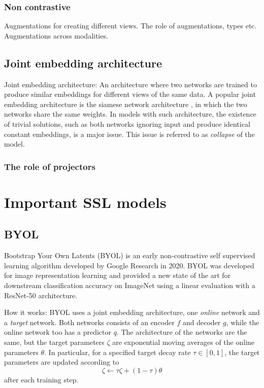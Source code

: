 \documentclass[../../thesis.tex]{subfiles}
\begin{document}
\subsubsection{Non contrastive}

Augmentations for creating different views. The role of augmentations, types etc. Augmentations across modalities. 

\subsection{Joint embedding architecture}

Joint embedding architecture: An architecture where two networks are trained to produce similar embeddings for different views of the same data. A popular joint embedding architecture is the siamese network architecture \cite{siamese}, in which the two networks share the same weights. In models with such architecture, the existence of trivial solutions, such as both networks ignoring input and produce identical constant embeddings, is a major issue. This issue is referred to as \textit{collapse} of the model.

\subsubsection{The role of projectors}

\section{Important SSL models}

\subsection{BYOL}
\cite{grill2020bootstrap}
Bootstrap Your Own Latents (BYOL) is an early non-contrastive self supervised learning algorithm developed by Google Research in 2020. BYOL was developed for image representation learning and provided a new state of the art for downstream classification accuracy on ImageNet using a linear evaluation with a ResNet-50 architecture. 

How it works:
BYOL uses a joint embedding architecture, one \textit{online} network and a \textit{target} network. Both networks consists of an encoder $f$ and decoder $g$, while the online network too has a predictor $q$. The architecture of the networks are the same, but the target parameters $\zeta$ are exponential moving averages of the online parameters $\theta$. In particular, for a specified target decay rate $\tau\in[0,1]$, the target parameters are updated according to 
\begin{equation}
    \zeta \leftarrow \tau \zeta + (1-\tau)\theta
\end{equation}
after each training step. \\\\
\end{document}
